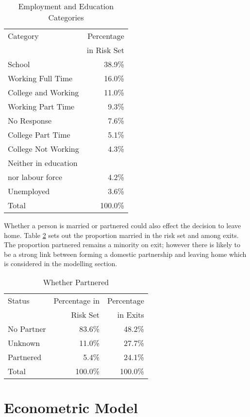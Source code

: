 \documentclass[12pt]{article}
\begin{document}
\begin{table}[htpb]
\centering
\caption{Employment and Education Categories}
\label{empEduTab}
\begin{tabular}{lr}
\toprule
Category & Percentage \\
& in Risk Set \\
\midrule
School &  38.9\% \\
  Working Full Time &  16.0\% \\
  College and Working &  11.0\% \\
  Working Part Time &   9.3\% \\
  No Response &   7.6\% \\
  College Part Time &   5.1\% \\
  College Not Working &   4.3\% \\
  Neither in education & \\
  nor labour force &   4.2\% \\
  Unemployed &   3.6\% \\
  Total & 100.0\% \\
\bottomrule
\end{tabular}
\end{table}

Whether a person is married or partnered could also effect the decision to leave home. Table \ref{marriedTab} sets out the proportion married in the risk set and among exits. The proportion partnered remains a minority on exit; however there is likely to be a strong link between forming a domestic partnership and leaving home which is considered in the modelling section.

\begin{table}[htpb]
\centering
\caption{Whether Partnered}
\label{marriedTab}
\begin{tabular}{lrr}
\toprule
Status & Percentage in & Percentage \\
 & Risk Set & in Exits \\
\midrule
No Partner &  83.6\% &  48.2\% \\
  Unknown &  11.0\% &  27.7\% \\
  Partnered &   5.4\% &  24.1\% \\
  Total & 100.0\% & 100.0\% \\
\bottomrule
\end{tabular}
\end{table}


\section{Econometric Model}
\end{document}
